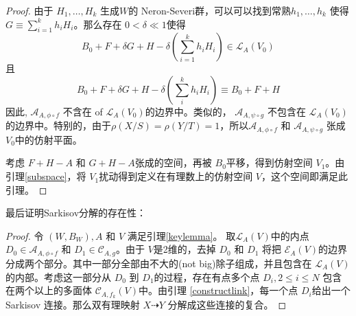 \begin{proof}
  由于 $H_{1},\ldots ,H_{k}$ 生成$W$的 Neron-Severi群，可以可以找到常熟$h_{1},\ldots ,h_{k}$ 使得 $G \equiv \sum^{k}_{i=1} h_{i}H_{i}$。那么存在 $0< \delta\ll 1$使得 
  \[B_{0}+F+\delta G+H- \delta(\sum_{i=1}^{k} h_{i}H_{i}) \in \mathcal{L}_{A}(V_{0})\]
  且
  \[ B_{0}+F+\delta G+H-\delta (\sum_i^k h_{i}H_{i}) \equiv B_{0}+F+H \]
  因此, $\mathcal{A}_{A,\phi\circ f}$ 不含在 of $\mathcal{L}_{A}(V_{0})$的边界中。类似的， $\mathcal{A}_{A,\psi\circ g}$ 不包含在 $\mathcal{L}_{A}(V_{0})$的边界中。特别的，由于$\rho(X/S)=\rho(Y/T)=1$，所以$\mathcal{A}_{A,\phi\circ f}$ 和   $\mathcal{A}_{A,\psi\circ g}$ 张成 $V_{0}$中的仿射平面。

  考虑 $F+H-A$ 和 $G+H-A$张成的空间，再被 $B_{0}$平移，得到仿射空间 $V_{1}$。由引理\ref{subspace}，将 $V_{1}$扰动得到定义在有理数上的仿射空间 $V$，这个空间即满足此引理。
\end{proof}

最后证明Sarkisov分解的存在性：
\begin{proof}
  令 $(W,B_{W}),A $ 和 $V$ 满足引理\ref{keylemma}。 取$ \mathcal{L}_A(V) $中的内点$ D_{0} \in \mathcal{A}_{A,\phi\circ f} $  和 $ D_1\in \mathcal{C}_{A,g} $。由于 $ V $是2维的，去掉 $ D_0 $ 和 $ D_1 $ 将把 $ \mathcal{E}_A(V) $的边界分成两个部分。其中一部分全部由不大的(not big)除子组成，并且包含在 $ \mathcal{L}_A(V) $的内部。考虑这一部分从 $ D_0 $ 到 $ D_1 $的过程，存在有点多个点 $ D_i , 2\leqslant i\leqslant N $ 包含在两个以上的多面体 $ \mathcal{C}_{A,f_{k}}(V) $中。由引理 \ref{constructlink}，每一个点 $ D_i $给出一个 Sarkisov 连接。那么双有理映射 $X \dashrightarrow Y$ 分解成这些连接的复合。
\end{proof}


